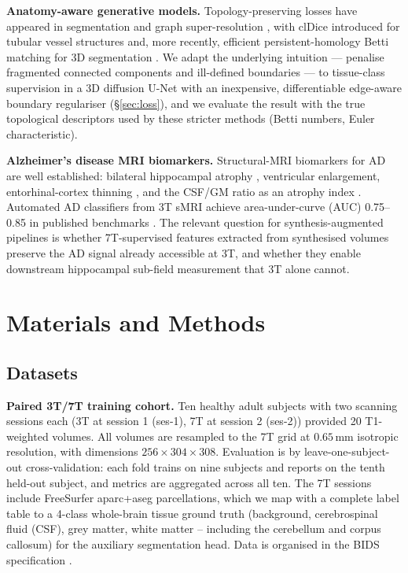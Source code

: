 \documentclass[10pt,twocolumn,a4paper]{article}
\begin{document}
\textbf{Anatomy-aware generative models.} Topology-preserving losses
have appeared in segmentation \cite{hu2019topology,clough2020topo} and
graph super-resolution \cite{singh2024strongly}, with clDice
\cite{shit2021cldice} introduced for tubular vessel structures and, more
recently, efficient persistent-homology Betti matching for 3D
segmentation \cite{stucki2024betti}. We adapt the underlying intuition
--- penalise fragmented connected components and ill-defined boundaries
--- to tissue-class supervision in a 3D diffusion U-Net with an
inexpensive, differentiable edge-aware boundary regulariser
(\S\ref{sec:loss}), and we evaluate the result with the true topological
descriptors used by these stricter methods (Betti numbers, Euler
characteristic).

\textbf{Alzheimer's disease MRI biomarkers.} Structural-MRI biomarkers
for AD are well established: bilateral hippocampal atrophy
\cite{frisoni2010clinical,jack2018niaaa}, ventricular enlargement,
entorhinal-cortex thinning \cite{wisse2014hippo}, and the CSF/GM ratio
as an atrophy index \cite{frisoni2010clinical}. Automated AD
classifiers from 3T sMRI achieve area-under-curve (AUC) 0.75--0.85 in
published benchmarks \cite{bron2015caddementia,cuingnet2011automatic,
basaia2019automated,liu2022generalizable,islam2018brain}. The relevant
question for synthesis-augmented pipelines is whether 7T-supervised
features extracted from synthesised volumes preserve the AD signal
already accessible at 3T, and whether they enable downstream
hippocampal sub-field measurement that 3T alone cannot.

\section{Materials and Methods}
\label{sec:methods}

\subsection{Datasets}
\label{sec:data}

\textbf{Paired 3T/7T training cohort.} Ten healthy adult subjects with
two scanning sessions each (3T at session 1 (ses-1), 7T at session 2
(ses-2)) provided 20 T1-weighted volumes. All volumes are resampled to the
7T grid at $0.65\,$mm isotropic resolution, with dimensions
$256{\times}304{\times}308$. Evaluation is by leave-one-subject-out
cross-validation: each fold trains on nine subjects and reports on the
tenth held-out subject, and metrics are aggregated across all ten. The 7T
sessions include FreeSurfer aparc+aseg parcellations, which we map with a
complete label table to a 4-class whole-brain tissue ground truth
(background, cerebrospinal fluid (CSF), grey matter, white matter --
including the cerebellum and corpus callosum) for the auxiliary
segmentation head. Data is
organised in the BIDS specification \cite{gorgolewski2016brain}.
\end{document}
